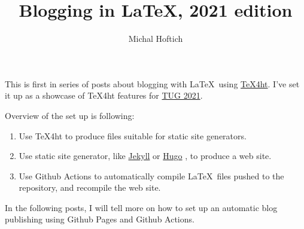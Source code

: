 \documentclass{article}
\title{Blogging in LaTeX, 2021 edition}
\author{Michal Hoftich}
\begin{document}
\maketitle


This is first in series of posts about blogging with \LaTeX\ using
\href{https://tug.org/tex4ht/}{\TeX4ht}. I've set it up as a showcase of
\TeX4ht features for \href{https://tug.org/tug2021/}{TUG 2021}.


Overview of the set up is following:

\begin{enumerate}
\item Use \TeX4ht to produce files suitable for static site generators.
\item Use static site generator, like \href{https://jekyllrb.com/}{Jekyll}
or \href{https://gohugo.io/}{Hugo}
, to produce a web site.
\item Use Github Actions to automatically compile \LaTeX\ files pushed
to the repository, and recompile the web site. 
\end{enumerate}

In the following posts, I will tell more on how to set up an automatic
blog publishing using Github Pages and Github Actions.
\end{document}
